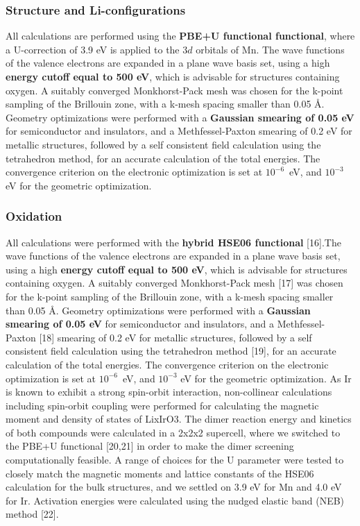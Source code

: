 \begin{refsection}
\subsubsection{Structure and Li-configurations} \label{appendix:sec-structure}
All calculations are performed using the \textbf{PBE+U functional  functional}, where a U-correction of 3.9 eV is applied to the $3d$ orbitals of Mn. The wave functions of the valence electrons are expanded in a plane wave basis set, using a high \textbf{energy cutoff equal to 500 eV}, which is advisable for structures containing oxygen. A suitably converged Monkhorst-Pack mesh was chosen for the k-point sampling of the Brillouin zone, with a k-mesh spacing smaller than 0.05 \AA. Geometry optimizations were performed with a \textbf{Gaussian smearing of 0.05 eV} for semiconductor and insulators, and a Methfessel-Paxton smearing of 0.2 eV for metallic structures, followed by a self consistent field calculation using the tetrahedron method, for an accurate calculation of the total energies. The convergence criterion on the electronic optimization is set at $10^{-6}$~eV, and $10^{-3}$ eV for the geometric optimization.

\subsubsection{Oxidation} \label{appendix:sec-oxidation}
All calculations were performed with the \textbf{hybrid HSE06 functional} [16].The wave functions of the valence electrons are expanded in a plane wave basis set, using a high \textbf{energy cutoff equal to 500 eV}, which is advisable for structures containing oxygen. A suitably converged Monkhorst-Pack mesh [17] was chosen for the k-point sampling of the Brillouin zone, with a k-mesh spacing smaller than 0.05 \AA. Geometry optimizations were performed with a \textbf{Gaussian smearing of 0.05 eV} for semiconductor and insulators, and a Methfessel-Paxton [18] smearing of 0.2 eV for metallic structures, followed by a self consistent field calculation using the tetrahedron method [19], for an accurate calculation of the total energies. The convergence criterion on the electronic optimization is set at $10^{-6}$~eV, and $10^{-3}$ eV for the geometric optimization. As Ir is known to exhibit a strong spin-orbit interaction, non-collinear calculations including spin-orbit coupling were performed for calculating the magnetic moment and density of states of LixIrO3. The dimer reaction energy and kinetics of both compounds were calculated in a 2x2x2 supercell, where we switched to the PBE+U functional [20,21] in order to make the dimer screening computationally feasible. A range of choices for the U parameter were tested to closely match the magnetic moments and lattice constants of the HSE06 calculation for the bulk structures, and we settled on 3.9 eV for Mn and 4.0 eV for Ir. Activation energies were calculated using the nudged elastic band (NEB) method [22]. 


\end{refsection}
